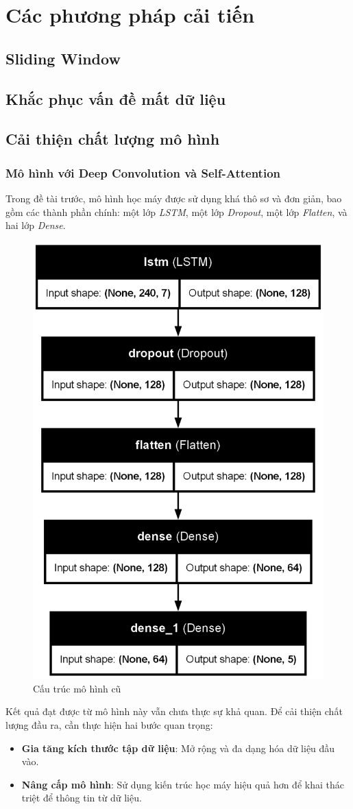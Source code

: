 \section{Các phương pháp cải tiến}
\subsection{Sliding Window}
\subsection{Khắc phục vấn đề mất dữ liệu}
\subsection{Cải thiện chất lượng mô hình}
\subsubsection{Mô hình với Deep Convolution và Self-Attention}

Trong đề tài trước, mô hình học máy được sử dụng khá thô sơ và đơn giản, bao gồm các thành phần chính: một lớp \textit{LSTM}, một lớp \textit{Dropout}, một lớp \textit{Flatten}, và hai lớp \textit{Dense}. 

\begin{figure}[H]
    \centering
    \includegraphics[width=0.5\linewidth]{Images/Improved methods/old_model_plot.png}
    \caption{Cấu trúc mô hình cũ}
    \label{fig:old-model}
\end{figure}

Kết quả đạt được từ mô hình này vẫn chưa thực sự khả quan. Để cải thiện chất lượng đầu ra, cần thực hiện hai bước quan trọng:
\begin{itemize}
    \item \textbf{Gia tăng kích thước tập dữ liệu}: Mở rộng và đa dạng hóa dữ liệu đầu vào.
    \item \textbf{Nâng cấp mô hình}: Sử dụng kiến trúc học máy hiệu quả hơn để khai thác triệt để thông tin từ dữ liệu.
\end{itemize}

